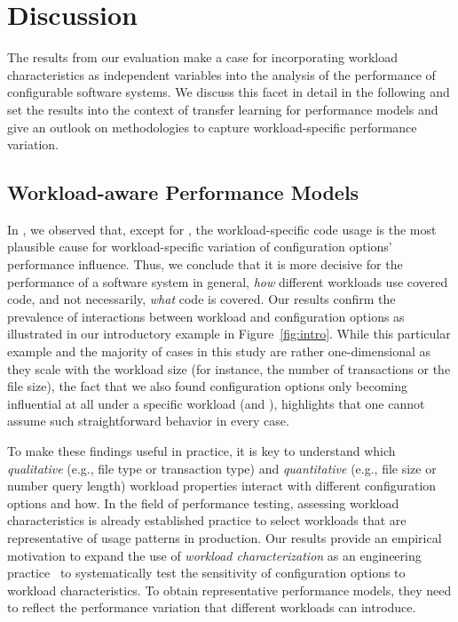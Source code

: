 \section{Discussion}
The results from our evaluation make a case for incorporating workload characteristics as independent variables into the analysis of the performance of configurable software systems. We discuss this facet in detail in the following and set the results into the context of transfer learning for performance models and give an outlook on methodologies to capture workload-specific performance variation.

\subsection{Workload-aware Performance Models}
In , we observed that, except for \jadx, the workload-specific code usage is the most plausible cause for workload-specific variation of configuration options’ performance influence. Thus, we conclude that it is more decisive for the performance of a software system in general, \emph{how} different workloads use covered code, and not necessarily, \emph{what} code is covered. Our results confirm the prevalence of interactions between workload and configuration options as illustrated in our introductory example in Figure~\ref{fig:intro}. While this particular example and the majority of cases in this study are rather one-dimensional as they scale with the workload size (for instance, the number of transactions or the file size), the fact that we also found configuration options only becoming influential at all under a specific workload (\kanzi and \dconvert), highlights that one cannot assume such straightforward behavior in every case. 

To make these findings useful in practice, it is key to understand which \emph{qualitative} (e.g., file type or transaction type) and \emph{quantitative} (e.g., file size or number query length) workload properties interact with different configuration options and how. In the field of performance testing, assessing workload characteristics is already established practice to select workloads that are representative of usage patterns in production. Our results provide an empirical motivation to expand the use of \emph{workload characterization} as an engineering practice~\cite{calzarossa2016} to systematically test the sensitivity of configuration options to workload characteristics. To obtain representative performance models, they need to reflect the performance variation that different workloads can introduce.

